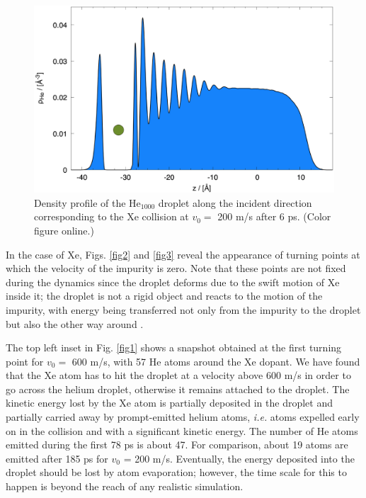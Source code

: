 \begin{figure}[!]
\centerline{\includegraphics[width=0.90\linewidth,clip]{fig4}} 
\caption{\label{fig4} 
Density profile of the He$_{1000}$ droplet along the incident direction corresponding to the Xe collision at $v_0=$
 200 m/s after 6 ps. (Color figure online.)
}
\end{figure}

In the case of Xe, Figs. \ref{fig2} and \ref{fig3}  reveal the appearance of turning points at which the velocity of the impurity is zero.
Note that these points are not fixed during the dynamics since the droplet deforms due to the swift motion of Xe inside it; 
the droplet is not a rigid object and reacts to the motion of the impurity, with  energy being transferred not only from the impurity 
to the droplet but also the other way around \cite{Mat14}.

The top left inset in Fig. \ref{fig1} shows a snapshot obtained at the first turning point for $v_0=$ 600 m/s, with 57 He atoms around the Xe dopant.
We have found that the Xe atom has to hit the droplet at a velocity above 600 m/s  in order to go across the helium droplet, otherwise it remains attached to the droplet.
The kinetic energy lost by the Xe atom is partially deposited in the droplet and partially carried away by prompt-emitted helium atoms, \textit{i.e.} atoms expelled 
early on in the collision and with a significant kinetic energy. The number of He atoms 
 emitted during the first 78 ps is about 47. For comparison, about 19 atoms are emitted after 185 ps for $v_0$ = 200 m/s. 
 Eventually, the energy deposited into the droplet should be lost by atom evaporation; however, the time scale for this to happen is 
 beyond the reach of any realistic simulation. 
 
